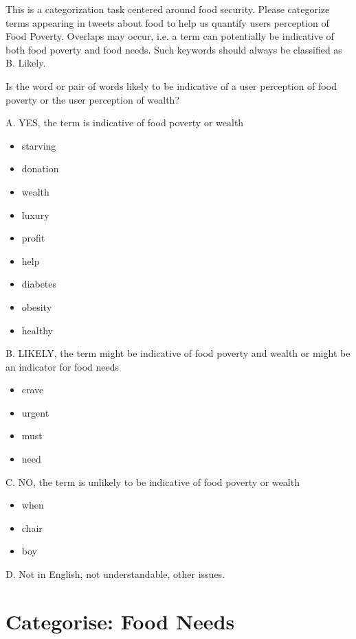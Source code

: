 This is a categorization task centered around food security. Please categorize terms appearing in tweets about food to help us quantify users perception of Food Poverty. Overlaps may occur, i.e. a term can potentially be indicative of both food poverty and food needs. Such keywords should always be classified as B. Likely.

Is the word or pair of words likely to be indicative of a user perception of food poverty or the user perception of wealth?

A. YES, the term is indicative of food poverty or wealth

\begin{itemize}

  \item starving
  \item donation
  \item wealth 
  \item luxury
  \item profit
  \item help
  \item diabetes
  \item obesity
  \item healthy

\end{itemize}

B. LIKELY, the term might be indicative of food poverty and wealth or might be an indicator for food needs\begin{itemize}
  \item crave
  \item urgent
  \item must
  \item need 
\end{itemize}

C. NO, the term is unlikely to be indicative of food poverty or wealth

\begin{itemize}
  \item when
  \item chair
  \item boy
\end{itemize}

D. Not in English, not understandable, other issues.

\newpage

\section{Categorise: Food Needs}

